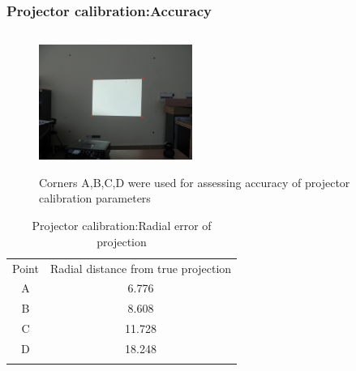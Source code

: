 \documentclass[9pt]{beamer}
\begin{document}
\begin{frame}
\frametitle{Projector calibration:Accuracy}
\begin{figure}
\centering
\includegraphics[width=5cm,height=4.5cm]{../Thesis_work/Latex_thesis_work/img_source/proj_calib_test.jpg}
\caption{Corners A,B,C,D were used for assessing accuracy of projector calibration parameters}
\label{fig:proj_calib_accuracy}
\end{figure}

\begin{table}[ht]
\centering
\vspace{-0.4cm}\begin{tabular}{c c}
\hline\noalign{\smallskip}
Point  & Radial distance from true projection \\
\noalign{\smallskip}\hline\noalign{\smallskip}
A   &  6.776 \\
B   &  8.608 \\
C   &  11.728\\
D   &  18.248\\
\noalign{\smallskip}\hline
\end{tabular}
\caption{Projector calibration:Radial error of projection}
\end{table}
\end{frame}

\end{document}

